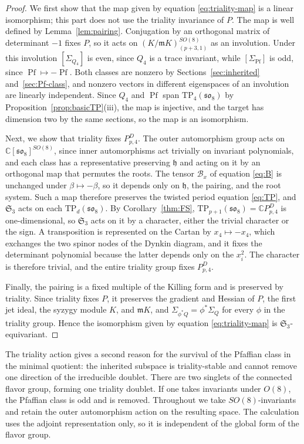 \documentclass[10pt,reqno]{amsart}
\numberwithin{equation}{section}
\theoremstyle{plain}
\theoremstyle{definition}
\newcommand{\Sym}{\mathfrak{S}}
\DeclareMathOperator{\Pf}{Pf}
\newcommand{\TP}{\mathrm{TP}}
\begin{document}
\begin{proof}
We first show that the map given by equation \eqref{eq:triality-map} is a linear isomorphism; this part does not use the triality invariance of $P$. The map is well defined by Lemma~\ref{lem:pairing}. Conjugation by an orthogonal matrix of determinant $-1$ fixes $P$, so it acts on $(K/\mathfrak{m}K)^{SO(8)}_{(p+3,1)}$ as an involution. Under this involution $[\Sigma_{Q_4}]$ is even, since $Q_4$ is a trace invariant, while $[\Sigma_{\Pf}]$ is odd, since $\Pf\mapsto-\Pf$. Both classes are nonzero by Sections~\ref{sec:inherited} and~\ref{sec:Pf-class}, and nonzero vectors in different eigenspaces of an involution are linearly independent. Since $Q_4$ and $\Pf$ span $\TP_4(\mathfrak{so}_8)$ by Proposition~\ref{prop:basicTP}(iii), the map is injective, and the target has dimension two by the same sections, so the map is an isomorphism.

Next, we show that triality fixes $P^D_{p,4}$. The outer automorphism group acts on $\mathbb{C}[\mathfrak{so}_8]^{SO(8)}$, since inner automorphisms act trivially on invariant polynomials, and each class has a representative preserving $\mathfrak{h}$ and acting on it by an orthogonal map that permutes the roots. The tensor $\mathcal{B}_x$ of equation \eqref{eq:B} is unchanged under $\beta\mapsto-\beta$, so it depends only on $\mathfrak{h}$, the pairing, and the root system. Such a map therefore preserves the twisted period equation \eqref{eq:TP}, and $\Sym_3$ acts on each $\TP_d(\mathfrak{so}_8)$. By Corollary~\ref{thm:FS}, $\TP_{p+1}(\mathfrak{so}_8)=\mathbb{C} P^D_{p,4}$ is one-dimensional, so $\Sym_3$ acts on it by a character, either the trivial character or the sign. A transposition is represented on the Cartan by $x_4\mapsto-x_4$, which exchanges the two spinor nodes of the Dynkin diagram, and it fixes the determinant polynomial because the latter depends only on the $x_i^2$. The character is therefore trivial, and the entire triality group fixes $P^D_{p,4}$.

Finally, the pairing is a fixed multiple of the Killing form and is preserved by triality. Since triality fixes $P$, it preserves the gradient and Hessian of $P$, the first jet ideal, the syzygy module $K$, and $\mathfrak{m} K$, and $\Sigma_{\phi^*Q}=\phi^*\Sigma_Q$ for every $\phi$ in the triality group. Hence the isomorphism given by equation \eqref{eq:triality-map} is $\Sym_3$-equivariant.
\end{proof}

The triality action gives a second reason for the survival of the Pfaffian class in the minimal quotient: the inherited subspace is triality-stable and cannot remove one direction of the irreducible doublet. There are two singlets of the connected flavor group, forming one triality doublet. If one takes invariants under $O(8)$, the Pfaffian class is odd and is removed. Throughout we take $SO(8)$-invariants and retain the outer automorphism action on the resulting space. The calculation uses the adjoint representation only, so it is independent of the global form of the flavor group.
\end{document}
